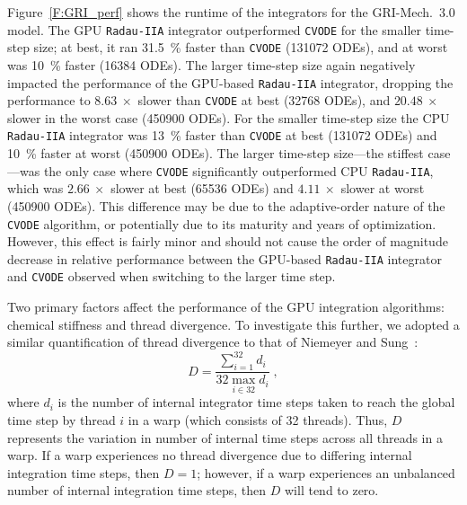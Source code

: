 \documentclass[preprint]{elsarticle}
\begin{document}
Figure~\ref{F:GRI_perf} shows the runtime of the integrators for the GRI-Mech.~3.0 model.
The GPU \texttt{Radau-IIA} integrator outperformed \texttt{CVODE} for the smaller time-step size; at best, it ran \SI{31.5}{\percent} faster than \texttt{CVODE} (\num{131072} ODEs), and at worst was \SI{10}{\percent} faster (\num{16384} ODEs).
The larger time-step size again negatively impacted the performance of the GPU-based \texttt{Radau-IIA} integrator, dropping the performance to $\SI{8.63}{\times}$ slower than \texttt{CVODE} at best (\num{32768} ODEs), and $\SI{20.48}{\times}$ slower in the worst case (\num{450900} ODEs).
For the smaller time-step size the CPU \texttt{Radau-IIA} integrator was \SI{13}{\percent} faster than \texttt{CVODE} at best (\num{131072} ODEs) and \SI{10}{\percent} faster at worst (\num{450900} ODEs).
The larger time-step size---the stiffest case---was the only case where \texttt{CVODE} significantly outperformed CPU \texttt{Radau-IIA}, which was $\SI{2.66}{\times}$ slower at best (\num{65536} ODEs) and $\SI{4.11}{\times}$ slower at worst (\num{450900} ODEs).
This difference may be due to the adaptive-order nature of the \texttt{CVODE} algorithm, or potentially due to its maturity and years of optimization.
However, this effect is fairly minor and should not cause the order of magnitude decrease in relative performance between the GPU-based \texttt{Radau-IIA} integrator and \texttt{CVODE} observed when switching to the larger time step.

Two primary factors affect the performance of the GPU integration algorithms: chemical stiffness and thread divergence.
To investigate this further, we adopted a similar quantification of thread divergence to that of Niemeyer and Sung~\cite{Niemeyer:2014aa}:
\begin{equation}
	D = \frac{\sum_{i=1}^{32}{d_i}}{32 \max_{i \in 32} d_i} \;,
	\label{eqn:divergence}
\end{equation}
where $d_i$ is the number of internal integrator time steps taken to reach the global time step by thread $i$ in a warp (which consists of 32 threads).
Thus, $D$ represents the variation in number of internal time steps across all threads in a warp.
If a warp experiences no thread divergence due to differing internal integration time steps, then $D = 1$; however, if a warp experiences an unbalanced number of internal integration time steps, then $D$ will tend to zero.
\end{document}
